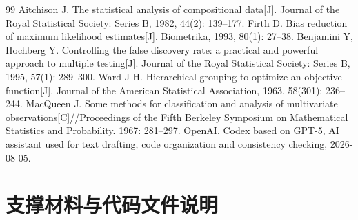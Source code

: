 \documentclass[UTF8,zihao=-4,a4paper,fontset=fandol]{ctexart}
\begin{document}
\begin{thebibliography}{99}
   Aitchison J. The statistical analysis of compositional data[J]. Journal of the Royal Statistical Society: Series B, 1982, 44(2): 139--177.
   Firth D. Bias reduction of maximum likelihood estimates[J]. Biometrika, 1993, 80(1): 27--38.
   Benjamini Y, Hochberg Y. Controlling the false discovery rate: a practical and powerful approach to multiple testing[J]. Journal of the Royal Statistical Society: Series B, 1995, 57(1): 289--300.
   Ward J H. Hierarchical grouping to optimize an objective function[J]. Journal of the American Statistical Association, 1963, 58(301): 236--244.
   MacQueen J. Some methods for classification and analysis of multivariate observations[C]//Proceedings of the Fifth Berkeley Symposium on Mathematical Statistics and Probability. 1967: 281--297.
   OpenAI. Codex based on GPT-5, AI assistant used for text drafting, code organization and consistency checking, 2026-08-05.
\end{thebibliography}

\CumcmMainMatterEnd
\appendix
{}

\section{支撑材料与代码文件说明}
\end{document}
